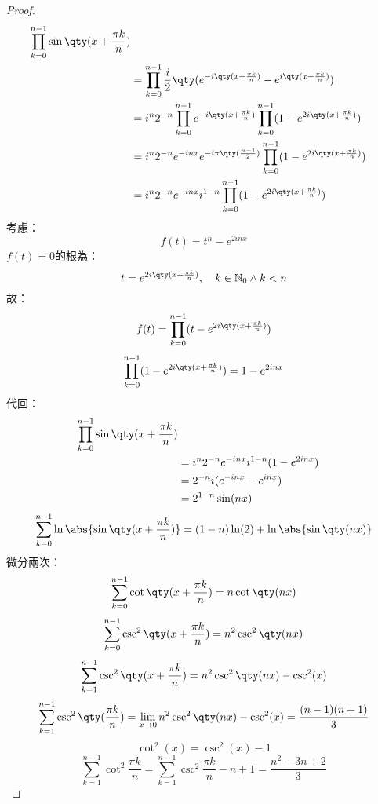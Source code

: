 \documentclass[a4paper,12pt]{report}
\begin{document}
\begin{proof}
\[\begin{aligned}
\prod_{k=0}^{n-1}\sin\qty(x+\frac{\pi k}{n})\\
&=\prod_{k=0}^{n-1}\frac{i}{2}\qty(e^{-i\qty(x+\frac{\pi k}{n})}-e^{i\qty(x+\frac{\pi k}{n})})\\
&=i^n2^{-n}\prod_{k=0}^{n-1}e^{-i\qty(x+\frac{\pi k}{n})}\prod_{k=0}^{n-1}(1-e^{2i\qty(x+\frac{\pi k}{n})})\\
&=i^n2^{-n}e^{-inx}e^{-i\pi\qty(\frac{n-1}{2})}
\prod_{k=0}^{n-1}(1-e^{2i\qty(x+\frac{\pi k}{n})})\\
&=i^n2^{-n}e^{-inx}i^{1-n}\prod_{k=0}^{n-1}(1-e^{2i\qty(x+\frac{\pi k}{n})})
\end{aligned}\]
考慮：
\[f(t)=t^n-e^{2inx}\]
$f(t)=0$的根為：
\[t=e^{2i\qty(x+\frac{\pi k}{n})},\quad k\in\mathbb{N}_0\land k<n\]
故：
\[f(t)=\prod_{k=0}^{n-1}(t-e^{2i\qty(x+\frac{\pi k}{n})})\]
\[\prod_{k=0}^{n-1}(1-e^{2i\qty(x+\frac{\pi k}{n})})=1-e^{2inx}\]
代回：
\[\begin{aligned}
\prod_{k=0}^{n-1}\sin\qty(x+\frac{\pi k}{n})\\
&=i^n2^{-n}e^{-inx}i^{1-n}(1-e^{2inx})\\
&=2^{-n}i(e^{-inx}-e^{inx})\\
&=2^{1-n}\sin(nx)
\end{aligned}\]
\[\sum_{k=0}^{n-1}\ln\abs{\sin\qty(x+\frac{\pi k}{n})}=(1-n)\ln(2)+\ln\abs{\sin\qty(nx)}\]
微分兩次：
\[\sum_{k=0}^{n-1}\cot\qty(x+\frac{\pi k}{n})=n\cot\qty(nx)\]
\[\sum_{k=0}^{n-1}\csc^2\qty(x+\frac{\pi k}{n})=n^2\csc^2\qty(nx)\]
\[\sum_{k=1}^{n-1}\csc^2\qty(x+\frac{\pi k}{n})=n^2\csc^2\qty(nx)-\csc^2(x)\]
\[\sum_{k=1}^{n-1}\csc^2\qty(\frac{\pi k}{n})=\lim_{x\to 0}n^2\csc^2\qty(nx)-\csc^2(x)=\frac{(n-1)(n+1)}{3}\]
\[\cot^2(x)=\csc^2(x)-1\]
\[\sum_{k=1}^{n-1}\cot^2\frac{\pi k}{n}=\sum_{k=1}^{n-1}\csc^2\frac{\pi k}{n}-n+1=\frac{n^2-3n+2}{3}\]
\end{proof}
\end{document}

